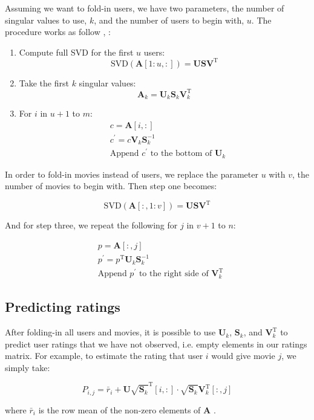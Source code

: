 \documentclass{article} %
\newcommand{\A}{\mathbf{A}}
\newcommand{\T}{\textrm{T}}
\begin{document}
Assuming we want to fold-in users, we have two parameters, the number of singular values to use, $k$, and the number of users to begin with, $u$. 
The procedure works as follow \cite{slides}, :

\begin{enumerate}
\item Compute full SVD for the first $u$ users:
$$\textrm{SVD}(\A[1:u,:]) = \mathbf{U}\mathbf{S}\mathbf{V}^{\T}$$
\item Take the first $k$ singular values:
$$\A_k= \mathbf{U}_k\mathbf{S}_k\mathbf{V}_k^{\T}$$
\item For $i$ in $u+1$ to $m$:
\begin{align*}
&c = \A[i,:]\\
&c^{\prime} = c \mathbf{V}_k \mathbf{S}_k^{-1}\\
&\textrm{Append $c^{\prime}$ to the bottom of $\mathbf{U}_k$}
\end{align*}
\end{enumerate}

In order to fold-in movies instead of users, we replace the parameter $u$ with $v$, the number of movies to begin with. Then step one becomes:

$$\textrm{SVD}(\A[:,1:v]) = \mathbf{U}\mathbf{S}\mathbf{V}^{\T}$$

And for step three, we repeat the following for $j$ in $v+1$ to $n$:

\begin{align*}
&p = \A[:,j]\\
&p^{\prime} = p^{\T}\mathbf{U}_k\mathbf{S}_k^{-1}\\
&\textrm{Append $p^{\prime}$ to the right side of $\mathbf{V}_k^{\T}$}
\end{align*}

\subsection{Predicting ratings}

After folding-in all users and movies, it is possible to use $\mathbf{U}_k$, $\mathbf{S}_k$, and $\mathbf{V}_k^{\T}$ to predict user ratings that we have not observed, i.e. empty elements in our ratings matrix.
For example, to estimate the rating that user $i$ would give movie $j$, we simply take:

$$P_{i,j} = \bar{r}_i + \mathbf{U}\sqrt{\mathbf{S}_k}^{\T}[i,:]
\cdot \sqrt{\mathbf{S}_k}\mathbf{V}_k^{\T}[:,j]$$

where $\bar{r}_i$ is the row mean of the non-zero elements of $\A$  \cite{sarwar2002}.
\end{document}
